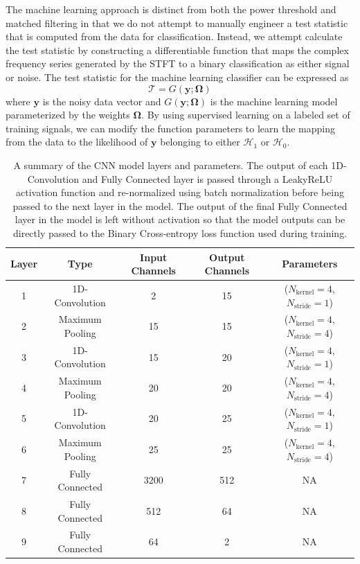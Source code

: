 The machine learning approach is distinct from both the power threshold and matched filtering in that we do not attempt to manually engineer a test statistic that is computed from the data for classification. Instead, we attempt calculate the test statistic by constructing a differentiable function that maps the complex frequency series generated by the STFT to a binary classification as either signal or noise. The test statistic for the machine learning classifier can be expressed as
\begin{equation}
    \mathcal{T} = G(\mathbf{y};\mathbf{\Omega})
\end{equation}
where $\mathbf{y}$ is the noisy data vector and $G(\mathbf{y}; \mathbf{\Omega})$ is the machine learning model parameterized by the weights $\mathbf{\Omega}$. By using supervised learning on a labeled set of training signals, we can modify the function parameters to learn the mapping from the data to the likelihood of $\mathbf{y}$ belonging to either $\mathcal{H}_1$ or $\mathcal{H}_0$.

\begin{table}[h]
\centering
\caption{A summary of the CNN model layers and parameters. The output of each 1D-Convolution and Fully Connected layer is passed through a LeakyReLU activation function and re-normalized using batch normalization before being passed to the next layer in the model. The output of the final Fully Connected layer in the model is left without activation so that the model outputs can be directly passed to the Binary Cross-entropy loss function used during training. \label{tab:cnn_model_params}}
\smallskip
\begin{tabular}{|c|c|c|c|c|}
\hline
Layer&Type&Input Channels&Output Channels&Parameters\\
\hline
1 & 1D-Convolution & 2 & 15 & ($N_{\textrm{kernel}}=4$, $N_{\textrm{stride}}=1$)\\
2 & Maximum Pooling & 15 & 15 & ($N_{\textrm{kernel}}=4$, $N_{\textrm{stride}}=4$) \\
3 & 1D-Convolution & 15 & 20 & ($N_{\textrm{kernel}}=4$, $N_{\textrm{stride}}=1$)\\
4 & Maximum Pooling & 20 & 20 & ($N_{\textrm{kernel}}=4$, $N_{\textrm{stride}}=4$) \\
5 & 1D-Convolution & 20 & 25 & ($N_{\textrm{kernel}}=4$, $N_{\textrm{stride}}=1$)\\
6 & Maximum Pooling & 25 & 25 & ($N_{\textrm{kernel}}=4$, $N_{\textrm{stride}}=4$) \\
7 & Fully Connected & 3200 & 512 & NA \\
8 & Fully Connected & 512 & 64 & NA \\
9 & Fully Connected & 64 & 2 & NA \\
\hline
\end{tabular}
\end{table}

